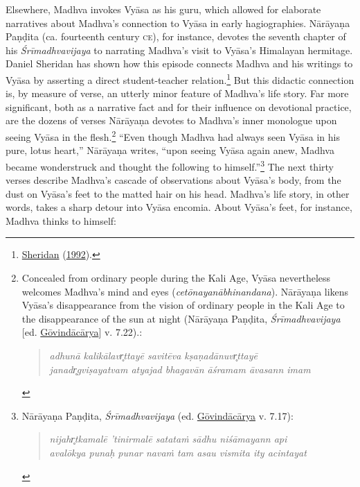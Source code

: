 Elsewhere, Madhva invokes Vyāsa as his guru, which allowed for elaborate narratives about Madhva’s connection to Vyāsa in early hagiographies. Nārāyaṇa Paṇḍita (ca. fourteenth century \textsc{ce}), for instance, devotes the seventh chapter of his \emph{{Śrīmadhvavijaya}} to narrating Madhva’s visit to Vyāsa’s Himalayan hermitage. Daniel Sheridan has shown how this episode connects Madhva and his writings to Vyāsa by asserting a direct student-teacher relation.\footnote{%
\hyperref[Sheridan1992]{Sheridan} (\hyperref[Sheridan1992]{1992}).
}
 But this didactic connection is, by measure of verse, an utterly minor feature of Madhva’s life story. Far more significant, both as a narrative fact and for their influence on devotional practice, are the dozens of verses Nārāyaṇa devotes to Madhva’s inner monologue upon seeing Vyāsa in the flesh.\footnote{%
Concealed from ordinary people during the Kali Age, Vyāsa nevertheless welcomes Madhva’s mind and eyes (\emph{cetōnayanābhinandana}). Nārāyaṇa likens Vyāsa’s disappearance from the vision of ordinary people in the Kali Age to the disappearance of the sun at night (Nārāyaṇa Paṇḍita, \emph{{Śrīmadhvavijaya}} [ed. \hyperref[NarayanaPandita2017]{Gōvindācārya}] v. 7.22).:

\vspace{-1.5ex}\begin{quote}\raggedright
      \emph{adhunā kalikālavr̥ttayē savitēva kṣaṇadānuvr̥ttayē}\\
\emph{janadr̥gviṣayatvam atyajad bhagavān āśramam āvasann imam}\end{quote}\vspace{-1.5ex}
      }
 “Even though Madhva had always seen Vyāsa in his pure, lotus heart,” Nārāyaṇa writes, “upon seeing Vyāsa again anew, Madhva became wonderstruck and thought the following to himself.”\footnote{%
Nārāyaṇa Paṇḍita, \emph{{Śrīmadhvavijaya}} (ed. \hyperref[NarayanaPandita2017]{Gōvindācārya} v. 7.17):

\vspace{-1.5ex}\begin{quote}\raggedright
      \emph{nijahr̥tkamalē ’tinirmalē satataṁ sādhu niśāmayann api}\\
\emph{avalōkya punaḥ punar navaṁ tam asau vismita ity acintayat}\end{quote}\vspace{-1.5ex}
      }
 The next thirty verses describe Madhva’s cascade of observations about Vyāsa’s body, from the dust on Vyāsa’s feet to the matted hair on his head. Madhva’s life story, in other words, takes a sharp detour into Vyāsa encomia. About Vyāsa’s feet, for instance, Madhva thinks to himself:

